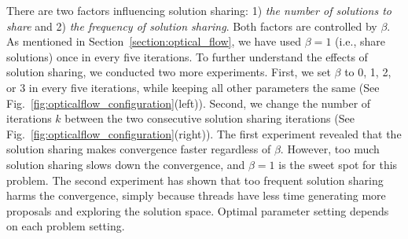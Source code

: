 There are two factors influencing solution sharing: 1) \textit{the
number of solutions to share} and 2) \textit{the frequency of solution
sharing}. Both factors are controlled by $\beta$. As mentioned in
Section~\ref{section:optical_flow}, we have used $\beta = 1$ (i.e., share
solutions) once in every five iterations.  To further understand the
effects of solution sharing, we conducted two more experiments. First,
we set $\beta$ to 0, 1, 2, or 3 in every five iterations,
while keeping all other parameters the same (See
Fig.~\ref{fig:opticalflow_configuration}(left)).  Second, we change the number of
iterations $k$ between the two consecutive solution sharing iterations
(See Fig.~\ref{fig:opticalflow_configuration}(right)).  The first experiment
revealed that the solution sharing makes convergence faster regardless of
$\beta$.  However, too much solution sharing slows down the convergence,
and $\beta=1$ is the sweet spot for this problem.
%
%
The second experiment has shown that too frequent solution sharing
harms the convergence, simply because threads have less time generating more
proposals and exploring the solution space.
Optimal parameter setting depends on each problem setting.


